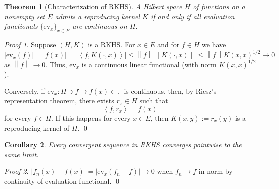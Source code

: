 \documentclass[a4paper,12pt]{article}
\newtheorem{thm}{Theorem}[section]
\newtheorem{cor}[thm]{Corollary}
\theoremstyle{remark}
\newtheorem*{prf}{Proof}
\theoremstyle{definition}
\theoremstyle{definition}
\theoremstyle{definition}
\newcommand{\ip}[2]{\left<#1, #2 \right>}
\newcommand{\abs}[1]{\left| #1 \right|}
\newcommand{\norm}[1]{\left\| #1 \right\|}
\newcommand{\ev}[1]{\mathrm{ev}_{#1}}
\begin{document}
\begin{thm}[Characterization of RKHS]\label{chara RKHS}
	A Hilbert space \( H \) of functions on a nonempty set \( E \) admits a reproducing kernel \( K \) if and only if all evaluation functionals \( \{\ev{x} \} _{x \in E} \) are continuous on \( H \).
\end{thm}
\begin{prf}
	Suppose \( (H,K) \) is a RKHS.
	For \( x \in E \) and for \( f \in H \) we have
	\[
		\abs{\ev{x}(f)} = \abs{f(x)} = \abs{ \ip{f}{K(\cdot , x)}} \le \norm{f} \norm{K(\cdot,x )} \le \norm{f} K(x,x) ^{1/2} \to 0
	\]
	as \(  \norm{f}\to 0 \). Thus, \( \ev{x} \) is a continuous linear functional (with norm \( K(x,x) ^{1/2} \)).

	Conversely, if \( \ev{x}:H \ni f \mapsto f(x) \in \mathbb{F} \) is continuous, then, by Riesz's representation theorem, there exists \( r_x \in H\) such that
	\begin{equation*}
		\ip{f}{r_x} = f(x)
	\end{equation*}
	for every \( f \in H \). If this happens for every \( x \in E \), then \( K(x,y):=r_x(y) \) is a reproducing kernel of \( H \).
	\qed\end{prf}

\begin{cor}\label{norm convergence implies pointwiese convergence}
	Every convergent sequence in RKHS converges pointwise to the same limit.
\end{cor}
\begin{prf}
	\( \abs{ f_n(x) - f(x)} = \abs{\ev{x}(f_n - f)} \to 0 \) when \( f_n \to f \) in norm by continuity of evaluation functional.
	\qed\end{prf}
\end{document}
